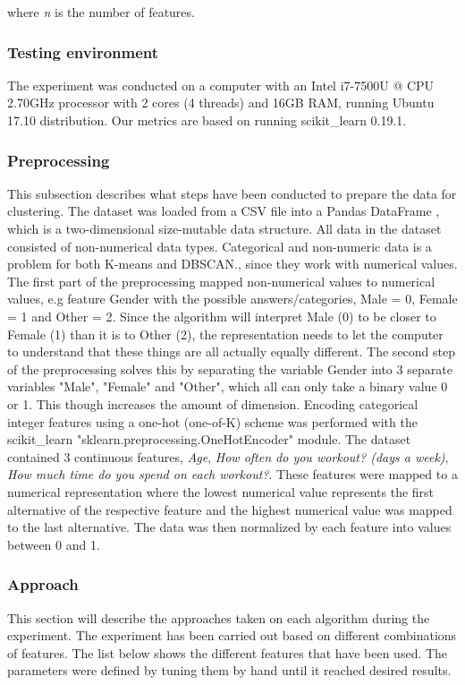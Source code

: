 \documentclass[a4paper]{article}
\begin{document}
where \textit{n} is the number of features.

\subsubsection{Testing environment}
The experiment was conducted on a computer with an Intel i7-7500U @ CPU 2.70GHz processor with 2 cores (4 threads) and 
16GB RAM, running Ubuntu 17.10 distribution. Our metrics are based on running 
scikit\_learn 0.19.1.

\subsubsection{Preprocessing}
This subsection describes what steps have been conducted to prepare the data for clustering. 
The dataset was loaded from a CSV file into a Pandas DataFrame \cite{pandas-dataframe}, which is a two-dimensional size-mutable data structure.  All data in the dataset consisted of non-numerical data types. Categorical and non-numeric data is a problem for both K-means and DBSCAN.\cite{encoding-categorical-features}, since they work with numerical values. The first part of the preprocessing mapped non-numerical values to numerical values, e.g feature Gender with the possible answers/categories, Male = 0, Female = 1 and Other = 2. Since the algorithm will interpret Male (0) to be closer to Female (1) than it is to Other (2), the representation needs to let the computer to understand that these things are all actually equally different. The second 
step of the preprocessing solves this by separating the variable Gender into 3 separate variables\cite{oneHotPaper} "Male", "Female" and "Other", which all can only take a binary value 0 or 1. This though increases the amount of dimension. Encoding categorical integer features using a one-hot (one-of-K) scheme was performed with the scikit\_learn "sklearn.preprocessing.OneHotEncoder" \cite{OneHotEncoder} module.
The dataset contained 3 continuous features, \textit{Age}, \textit{How often do you workout? (days a week)}, \textit{How much time do you spend on each workout?}. These features were mapped to a numerical representation where the lowest numerical value represents the first alternative of the respective feature and the highest numerical value was mapped to the last alternative. The data was then normalized by each feature into values between 0 and 1.

\newpage
\subsubsection{Approach}
This section will describe the approaches taken on each algorithm during the experiment. The experiment has been carried out based on different combinations of features. The list below shows the different features that have been used. The parameters were defined by tuning them by hand until it reached desired results. \newline
\end{document}
